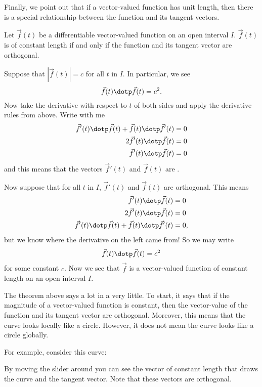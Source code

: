 \documentclass{ximera}
\begin{document}
Finally, we point out that if a vector-valued function has unit
length, then there is a special relationship between the function and
its tangent vectors.


\begin{theorem}
  Let $\vec f(t)$ be a differentiable vector-valued function on an
  open interval $I$. $\vec{f}(t)$ is of constant length if and only if
  the function and its tangent vector are orthogonal.
  \begin{explanation}
    Suppose that $|\vec f(t)| = c$ for all $t$ in $I$. In particular,
    we see
    \[
    \vec{f}(t) \dotp \vec{f}(t) = c^2.
    \]
    Now take the derivative with respect to $t$ of both sides and
    apply the derivative rules from above. Write with me
    \begin{align*}
      \vec{f}'(t) \dotp \vec{f}(t) + \vec{f}(t)\dotp \vec{f}'(t) &= 0\\
      2\vec{f}'(t) \dotp \vec{f}(t) &= 0\\
      \vec{f}'(t) \dotp \vec{f}(t) &= 0
    \end{align*}
    and this means that the vectors $\vec{f}'(t)$ and $\vec{f}(t)$ are
    .

    Now suppose that for all $t$ in $I$, $\vec{f}'(t)$ and
    $\vec{f}(t)$ are orthogonal. This means
    \begin{align*}
      \vec{f}'(t) \dotp \vec{f}(t) &= 0\\
      2\vec{f}'(t) \dotp \vec{f}(t) &= 0\\
      \vec{f}'(t) \dotp \vec{f}(t) + \vec{f}(t)\dotp \vec{f}'(t) &= 0,
    \end{align*}
    but we know where the derivative on the left came from! So we may
    write
    \[
    \vec{f}(t) \dotp \vec{f}(t) = c^2
    \]
    for some constant $c$. Now we see that $\vec{f}$ is a
    vector-valued function of constant length on an open interval
    $I$.
  \end{explanation}
\end{theorem}
The theorem above says a lot in a very little. To start, it says that
if the magnitude of a vector-valued function is constant, then the
vector-value of the function and its tangent vector are
orthogonal. Moreover, this means that the curve looks locally like a
circle. However, it does not mean the curve looks like a circle globally.
\begin{onlineOnly}
  For example, consider this curve:

  \begin{center}
  \end{center}

  By moving the slider around you can see the vector of constant
  length that draws the curve and the tangent vector. Note that these
  vectors are orthogonal.
\end{onlineOnly}
\end{document}

